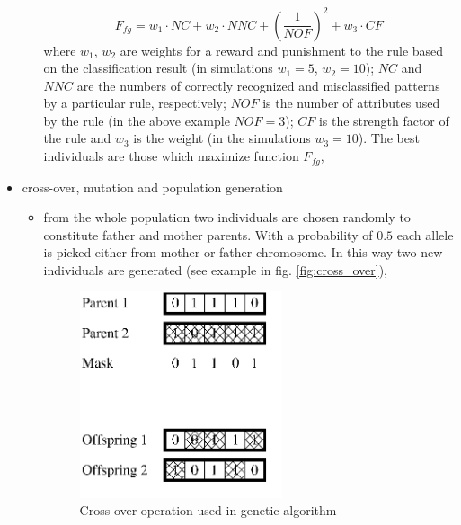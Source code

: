 \begin{itemize}
\begin{itemize}
                \begin{equation}
                    F_{fg} = w_1\cdot NC + w_2\cdot NNC + (\frac{1}{NOF})^2 +
                    w_3\cdot CF
                    \label{eq:fuzzy_fitness}
                \end{equation}
                where $w_1$, $w_2$ are weights for a reward and punishment to
                the rule based on the classification result (in simulations
                $w_1=5$, $w_2=10$); $NC$ and $NNC$ are
                the numbers of correctly recognized and misclassified patterns
                by a particular rule, respectively; $NOF$ is the number of
                attributes used by the rule (in the above example $NOF=3$);
                $CF$ is the strength factor of the rule and $w_3$ is the
                weight (in the simulations $w_3=10$).
                The best individuals are those which maximize function
                $F_{fg}$,
        \end{itemize}
    \item cross-over, mutation and population generation
        \begin{itemize}
            \item from the whole population two individuals are chosen
                randomly to constitute father and mother parents. With a
                probability of $0.5$ each allele is picked either from mother
                or father chromosome. In this way two new
                individuals are generated (see example in fig.
                \ref{fig:cross_over}),
                \begin{figure}[H]
                    \begin{center}
                        \includegraphics[width=0.6\textwidth, height=0.5\textwidth]{fig/cross_over.png}
                    \end{center}
                    \caption{Cross-over operation used in genetic algorithm}

\end{figure}
\end{itemize}
\end{itemize}

